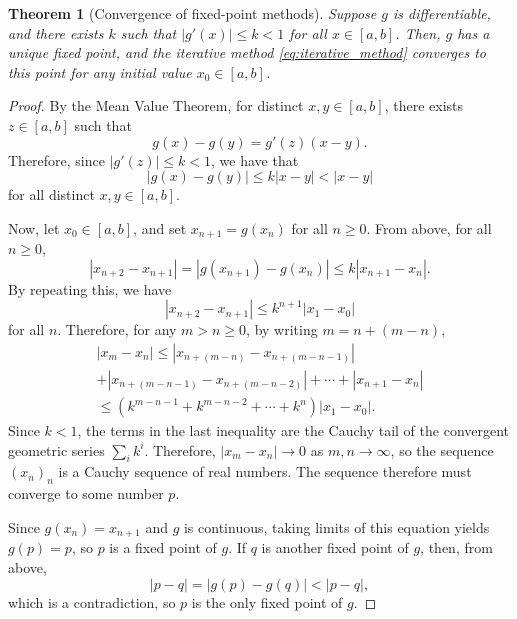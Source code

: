 \documentclass{article}
\theoremstyle{plain}
\newtheorem{theorem}[proposition]{Theorem}
\theoremstyle{definition}
\begin{document}
\begin{theorem}[Convergence of fixed-point methods]\label{thm:fixed_point}
  Suppose $g$ is differentiable, and there exists $k$ such that $|g'(x)| \leq k < 1$ for all $x \in [a,b]$.
  Then, $g$ has a unique fixed point, and the iterative method \eqref{eq:iterative_method} converges to this point for any initial value $x_0 \in [a,b]$.
\end{theorem}
\begin{proof}
  By the Mean Value Theorem, for distinct $x,y \in [a,b]$, there exists $z \in [a,b]$ such that
  \begin{equation*}
    g(x) - g(y) = g'(z)(x-y).
  \end{equation*}
  Therefore, since $|g'(z)| \leq k < 1$, we have that
  \begin{equation*}
    |g(x) - g(y)| \leq k|x-y| < |x-y|
  \end{equation*}
  for all distinct $x,y \in [a,b]$.

  Now, let $x_0 \in [a,b]$, and set $x_{n+1} = g(x_n)$ for all $n \geq 0$.
  From above, for all $n \geq 0$,
  \begin{equation*}
    |x_{n+2} - x_{n+1}| = |g(x_{n+1}) - g(x_n)| \leq k |x_{n+1} - x_n|.
  \end{equation*}
  By repeating this, we have
  \begin{equation*}
    |x_{n+2} - x_{n+1}| \leq k^{n+1} |x_1 - x_0|
  \end{equation*}
  for all $n$.
  Therefore, for any $m > n \geq 0$, by writing $m = n + (m-n)$,
  \begin{multline}
      |x_m - x_n| \leq |x_{n + (m-n)} - x_{n + (m-n-1)}| \\
      + |x_{n + (m-n-1)} - x_{n + (m-n-2)}| + \cdots + |x_{n+1} - x_n| \\
      \leq (k^{m-n-1} + k^{m-n-2} + \cdots + k^n)|x_1 - x_0|.
  \end{multline}
  Since $k < 1$, the terms in the last inequality are the Cauchy tail of the convergent geometric series $\sum_i k^i$.
  Therefore, $|x_m - x_n| \to 0$ as $m, n \to \infty$, so the sequence $(x_n)_n$ is a Cauchy sequence of real numbers.
  The sequence therefore must converge to some number $p$.

  Since $g(x_n) = x_{n+1}$ and $g$ is continuous, taking limits of this equation yields $g(p) = p$, so $p$ is a fixed point of $g$.
  If $q$ is another fixed point of $g$, then, from above,
  \begin{equation*}
    |p-q| = |g(p) - g(q)| < |p-q|,
  \end{equation*}
  which is a contradiction, so $p$ is the only fixed point of $g$.
\end{proof}
\end{document}

